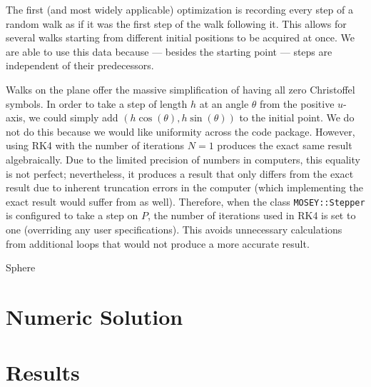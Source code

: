 \documentclass{article}
\begin{document}
	The first (and most widely applicable) optimization is recording every step of a random walk as if it was the first step of the walk following it.
	This allows for several walks starting from different initial positions to be acquired at once.
	We are able to use this data because --- besides the starting point --- steps are independent of their predecessors.
	
	Walks on the plane offer the massive simplification of having all zero Christoffel symbols.
	In order to take a step of length $h$ at an angle $\theta$ from the positive $u$-axis, we could simply add $(h\cos(\theta), h\sin(\theta))$ to the initial point.
	We do not do this because we would like uniformity across the code package.
	However, using RK4 with the number of iterations $N = 1$ produces the exact same result algebraically.
	Due to the limited precision of numbers in computers, this equality is not perfect; nevertheless, it produces a result that only differs from the exact result due to inherent truncation errors in the computer (which implementing the exact result would suffer from as well).
	Therefore, when the class \texttt{MOSEY::Stepper} is configured to take a step on $P$, the number of iterations used in RK4 is set to one (overriding any user specifications).
	This avoids unnecessary calculations from additional loops that would not produce a more accurate result.
	
	Sphere

\section{Numeric Solution}

\section{Results}



\end{document}
